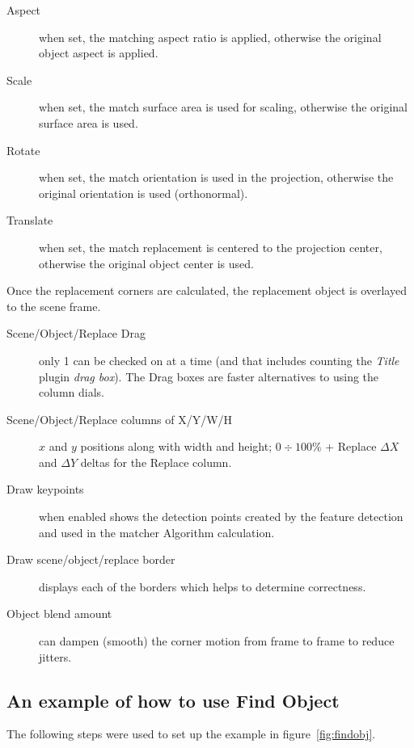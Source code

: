 \begin{description}
    \item[Aspect] when set, the matching aspect ratio is applied, otherwise the original object aspect is applied.
    \item[Scale] when set, the match surface area is used for scaling, otherwise the original surface area is used.
    \item[Rotate] when set, the match orientation is used in the projection, otherwise the original orientation is used (orthonormal).
    \item[Translate] when set, the match replacement is centered to the projection center, otherwise the original object center is used.
\end{description}

Once the replacement corners are calculated, the replacement object is overlayed to the scene frame.

\begin{description}
    \item[Scene/Object/Replace Drag] only 1 can be checked on at a time (and that includes counting the \textit{Title}
    plugin \textit{drag box}). The Drag boxes are faster alternatives to using the column dials.
    \item[Scene/Object/Replace columns of X/Y/W/H] $x$ and $y$ positions along with width and height; $0\div100\%$ + Replace $\Delta X$ and $\Delta Y$ deltas for the Replace column.
    \item[Draw keypoints] when enabled shows the detection points created by the feature detection and used in the matcher Algorithm calculation.
    \item[Draw scene/object/replace border] displays each of the borders which helps to determine correctness.
    \item[Object blend amount] can dampen (smooth) the corner motion from frame to frame to reduce jitters.
\end{description}

\subsection{An example of how to use Find Object}%
\label{sub:example_how_use_findobj}

The following steps were used to set up the example in figure~\ref{fig:findobj}.


